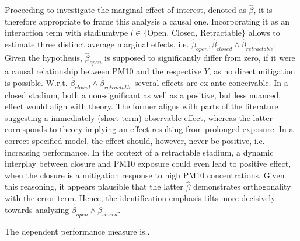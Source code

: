 \documentclass[12pt,a4paper]{article}
\begin{document}
{Proceeding to investigate the marginal effect of interest, denoted as $\hat{\beta}$, it is therefore appropriate to frame this analysis a causal one.  Incorporating it as an interaction term with stadiumtype $l \in \{$Open, Closed, Retractable$\}$ allows to estimate three distinct average marginal effects, i.e. $\hat{\beta}_{open},\hat{\beta}_{closed} \wedge \hat{\beta}_{retractable}$. Given the hypothesis, $\hat{\beta}_{open}$ is supposed to significantly differ from zero, if it were a causal relationship between PM10 and the respective $Y$, as no direct mitigation is possible. W.r.t. $\hat{\beta}_{closed} \wedge \hat{\beta}_{retractable}$ several effects are ex ante conceivable. In a closed stadium, both a non-significant as well as a positive, but less nuanced, effect would align with theory. The former aligns with parts of the literature suggesting a immediately (short-term)  observable effect, whereas the latter corresponds to theory implying an effect resulting from prolonged exposure. In a correct specified model, the effect should, however, never be positive, i.e. increasing performance. In the context of a retractable stadium, a dynamic interplay between closure and PM10 exposure could even lead to positive effect, when the closure is a mitigation response to high PM10 concentrations. Given this reasoning, it appears plausible that the latter $\hat{\beta}$ demonstrates orthogonality with the error term. Hence, the identification emphasis tilts more decisively towards analyzing $\hat{\beta}_{open} \wedge \hat{\beta}_{closed}$.

The dependent performance measure is..

}
\end{document}
